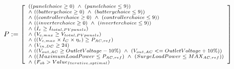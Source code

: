 \documentclass[journal,onecolumn]{IEEEtran}
\begin{document}
\begin{equation}              
\label{eq:quant_free_formulae_p}
\begin{scriptsize}
P := \left [ \begin{array}{ll} 
	((panelchoice \geq 0) \, \, \wedge \, \, (panelchoice \leq 9)) \\
	\wedge \, \, ((batterychoice \geq 0) \, \, \wedge \, \, (batterychoice \leq 9)) \\
	\wedge \, \, ((controllerchoice \geq 0) \, \, \wedge \, \, (controllerchoice \leq 9)) \\
	\wedge \, \, ((inverterchoice \geq 0) \, \, \wedge \, \, (inverterchoice \leq 9)) \\
	\wedge \, \, (I_{c} \geq I_{total,PVpanels}) \\
	\wedge \, \, (V_{c,max} \geq V_{total,PVpanels}) \\
	\wedge \, \, ((V_{c,max} \times I_{C} \times \eta_{c}) \geq P_{AC,ref}) \\
	\wedge \, \, (V_{in,DC} \geq 24)  \\
	\wedge \, \, ((V_{out,AC} \geq OutletVoltage-10\%) \, \, \wedge \, \, (V_{out,AC} <= OutletVoltage+10\%)) \\
	\wedge \, \, ((MaximumLoadPower \leq P_{AC,ref}) \, \, \wedge \, \, (SurgeLoadPower \leq MAX_{AC,ref})) \\
	\wedge \, \, (F_{ob} > Value_{Iterative,optimal}) \\
              \end{array} \right ]  \\
\end{scriptsize}
\end{equation}
\end{document}
